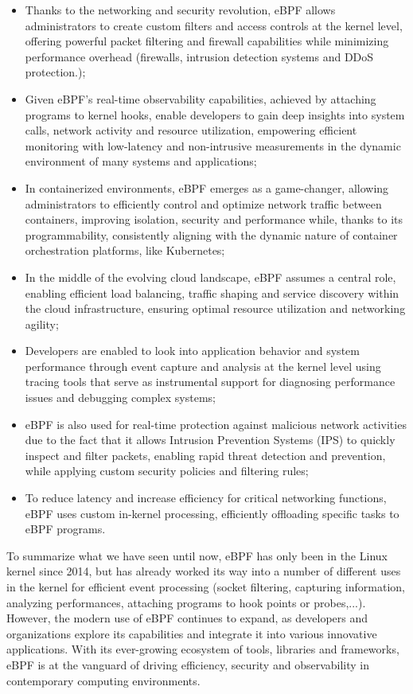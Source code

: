 \begin{itemize}
	\item Thanks to the networking and security revolution, eBPF allows administrators
		to create custom filters and access controls at the kernel level, offering powerful packet filtering and firewall capabilities while minimizing performance overhead (firewalls, intrusion detection systems and DDoS protection.);
	\item Given eBPF's real-time observability capabilities, achieved by attaching
		programs to kernel hooks, enable developers to gain deep insights into system calls, network activity and resource utilization, empowering efficient monitoring with low-latency and non-intrusive measurements in the dynamic environment of many systems and applications;
	\item In containerized environments, eBPF emerges as a game-changer, allowing
		administrators to efficiently control and optimize network traffic between containers, improving isolation, security and performance while, thanks to its programmability, consistently aligning with the dynamic nature of container orchestration platforms, like Kubernetes;
	\item In the middle of the evolving cloud landscape, eBPF assumes a central role,
		enabling efficient load balancing, traffic shaping and service discovery within the cloud infrastructure, ensuring optimal resource utilization and networking agility;
	\item Developers are enabled to look into application behavior and system
		performance through event capture and analysis at the kernel level using tracing tools that serve as instrumental support for diagnosing	performance issues and debugging complex systems;
	\item eBPF is also used for real-time protection against malicious network
		activities due to the fact that it allows Intrusion Prevention Systems (IPS) to quickly inspect and filter packets, enabling rapid threat detection and prevention, while applying custom security policies and filtering rules;
	\item To reduce latency and increase efficiency for critical networking functions,
		eBPF uses custom in-kernel processing, efficiently offloading specific tasks to eBPF programs.
\end{itemize}

To summarize what we have seen until now, eBPF has only been in the Linux kernel since 2014, but has already worked its way into a number of different uses in the kernel for efficient event processing (socket filtering, capturing information, analyzing performances, attaching programs to hook points or probes,...). 
However, the modern use of eBPF continues to expand, as developers and organizations explore its capabilities and integrate it into various innovative applications. 
With its ever-growing ecosystem of tools, libraries and frameworks, eBPF is at the vanguard of driving efficiency, security and observability in contemporary computing environments.

